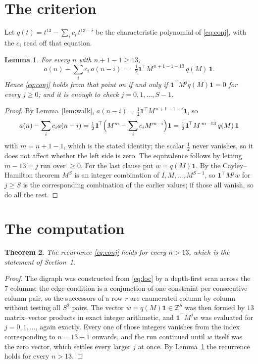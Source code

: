 \documentclass[11pt,a4paper]{article}
\theoremstyle{plain}
\newtheorem{theorem}{Theorem}
\newtheorem{lemma}[theorem]{Lemma}
\theoremstyle{definition}
\begin{document}
\section{The criterion}

Let $q(t)=t^{13}-\sum_i c_i\,t^{13-i}$ be the characteristic polynomial of
\eqref{eq:conj}, with the $c_i$ read off that equation.

\begin{lemma}\label{lem:crit}
For every $n$ with $n+1-1\ge13$,
\[
a(n)-\sum_i c_i\,a(n-i)\;=\;\tfrac1{2}\mathbf{1}^{\!\top}M^{\,n+1-1-13}\,q(M)\,\mathbf{1} .
\]
Hence \eqref{eq:conj} holds from that point on if and only if
$\mathbf{1}^{\!\top}M^{j}q(M)\mathbf{1}=0$ for every $j\ge0$; and it is enough to check
$j=0,1,\dots,S-1$.
\end{lemma}

\begin{proof}
By Lemma~\ref{lem:walk}, $a(n-i)=\tfrac1{2}\mathbf{1}^{\!\top}M^{\,n+1-1-i}\mathbf{1}$, so
\[
a(n)-\sum_i c_i a(n-i)
=\tfrac1{2}\mathbf{1}^{\!\top}\Bigl(M^{m}-\sum_i c_i M^{m-i}\Bigr)\mathbf{1}
=\tfrac1{2}\mathbf{1}^{\!\top}M^{\,m-13}\,q(M)\,\mathbf{1}
\]
with $m=n+1-1$, which is the stated identity; the scalar $\tfrac1{2}$ never vanishes, so
it does not affect whether the left side is zero. The equivalence follows by letting
$m-13=j$ run over $\ge0$. For the last clause put $w=q(M)\mathbf{1}$. By the
Cayley--Hamilton theorem $M^{S}$ is an integer combination of $I,M,\dots,M^{S-1}$, so
$\mathbf{1}^{\!\top}M^{j}w$ for $j\ge S$ is the corresponding combination of the earlier
values; if those all vanish, so do all the rest.
\end{proof}

\section{The computation}

\begin{theorem}
The recurrence \eqref{eq:conj} holds for every $n>13$, which is the statement of
Section~1.
\end{theorem}

\begin{proof}
The digraph was constructed from \eqref{eq:loc} by a depth-first scan across the $7$
columns: the edge condition is a conjunction of one constraint per consecutive column
pair, so the successors of a row $r$ are enumerated column by column without testing all
$S^2$ pairs. The vector $w=q(M)\mathbf{1}\in\mathbb{Z}^{S}$ was then formed by $13$
matrix--vector products in exact integer arithmetic, and $\mathbf{1}^{\!\top}M^{j}w$ was
evaluated for $j=0,1,\dots$, again exactly. Every one of those integers vanishes from the
index corresponding to $n=13+1$ onwards, and the run continued until $w$ itself was the
zero vector, which settles every larger $j$ at once. By Lemma~\ref{lem:crit} the recurrence
holds for every $n>13$.
\end{proof}
\end{document}
